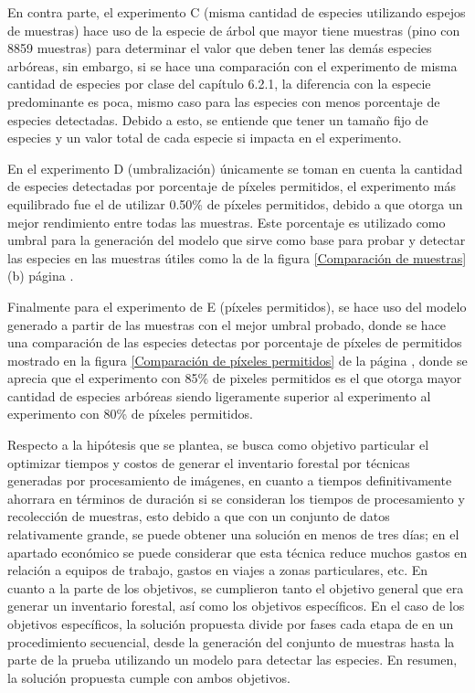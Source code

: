 En contra parte, el experimento C (misma cantidad de especies utilizando espejos de muestras) hace uso de la especie de árbol que mayor tiene muestras (pino con 8859 muestras) para determinar el valor que deben tener las demás especies arbóreas, sin embargo, si se hace una comparación con el experimento de misma cantidad de especies por clase del capítulo 6.2.1, la diferencia con la especie predominante es poca, mismo caso para las especies con menos porcentaje de especies detectadas. Debido a esto, se entiende que tener un tamaño fijo de especies y un valor total de cada especie si impacta en el experimento.

En el experimento D (umbralización) únicamente se toman en cuenta la cantidad de especies detectadas por porcentaje de píxeles permitidos, el experimento más equilibrado fue el de utilizar 0.50\% de píxeles permitidos, debido a que otorga un mejor rendimiento entre todas las muestras. Este porcentaje es utilizado como umbral para la generación del modelo que sirve como base para probar y detectar las especies en las muestras útiles como la de la figura \ref{Comparación de muestras} (b) página \pageref{Comparación de muestras}.

Finalmente para el experimento de E (píxeles permitidos), se hace uso del modelo generado a partir de las muestras con el mejor umbral probado, donde se hace una comparación de las especies detectas por porcentaje de píxeles de permitidos mostrado en la figura \ref{Comparación de píxeles permitidos} de la página \pageref{Comparación de píxeles permitidos}, donde se aprecia que el experimento con 85\% de pixeles permitidos es el que otorga mayor cantidad de especies arbóreas siendo ligeramente superior al experimento al experimento con 80\% de píxeles permitidos.

Respecto a la hipótesis que se plantea, se busca como objetivo particular el optimizar tiempos y costos de generar el inventario forestal por técnicas generadas por procesamiento de imágenes, en cuanto a tiempos definitivamente ahorrara en términos de duración si se consideran los tiempos de procesamiento y recolección de muestras, esto debido a que con un conjunto de datos relativamente grande, se puede obtener una solución en menos de tres días; en el apartado económico se puede considerar que esta técnica reduce muchos gastos en relación a equipos de trabajo, gastos en viajes a zonas particulares, etc. En cuanto a la parte de los objetivos, se cumplieron tanto el objetivo general que era generar un inventario forestal, así como los objetivos específicos. En el caso de los objetivos específicos, la solución propuesta divide por fases cada etapa de en un procedimiento secuencial, desde la generación del conjunto de muestras hasta la parte de la prueba utilizando un modelo para detectar las especies. En resumen, la solución propuesta cumple con ambos objetivos.

